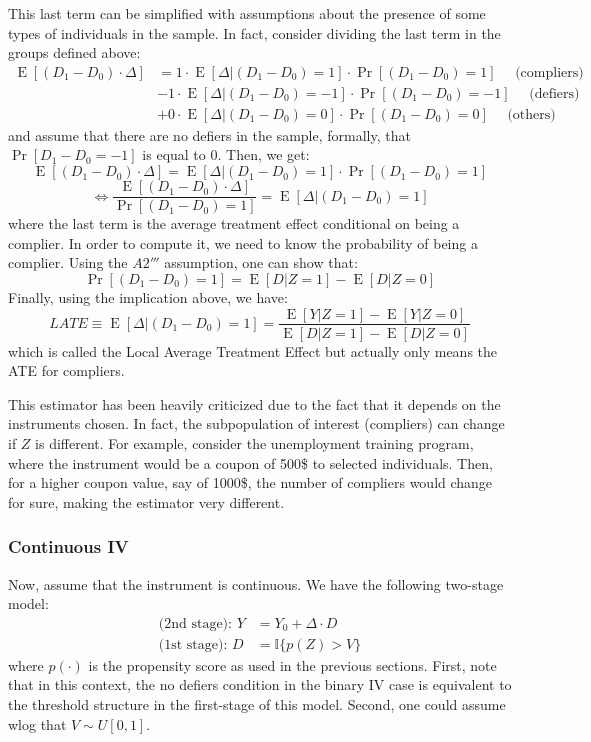 \documentclass[12pt]{report}
\newcommand{\E}[1]{\operatorname{E}\left[#1\right]}
\newcommand{\Prob}[1]{\operatorname{Pr}\left[#1\right]}
\begin{document}
This last term can be simplified with assumptions about the presence of some types of individuals in the sample. In fact, consider dividing the last term in the groups defined above: \begin{align*}
\E{(D_1 - D_0)\cdot \Delta} & = 1 \cdot \E{\Delta\vert(D_1 - D_0)=1} \cdot \Prob{(D_1 - D_0)=1} \quad \text{ (compliers)}\\
& - 1 \cdot \E{\Delta\vert(D_1 - D_0)=-1} \cdot \Prob{(D_1 - D_0)=-1} \quad \text{ (defiers)}\\
& + 0 \cdot \E{\Delta\vert(D_1 - D_0)=0} \cdot \Prob{(D_1 - D_0)=0} \quad \text{ (others)}
\end{align*}
and assume that there are no defiers in the sample, formally, that $\Prob{D_1 - D_0=-1}$ is equal to 0. Then, we get: $$\E{(D_1 - D_0)\cdot \Delta} = \E{\Delta\vert(D_1 - D_0)=1} \cdot \Prob{(D_1 - D_0)=1} $$
$$\Leftrightarrow \frac{\E{(D_1 - D_0)\cdot \Delta}}{\Prob{(D_1 - D_0)=1}} = \E{\Delta\vert(D_1 - D_0)=1} $$ where the last term is the average treatment effect conditional on being a complier. In order to compute it, we need to know the probability of being a complier. Using the $A2'''$ assumption, one can show that: $$
\Prob{(D_1 - D_0)=1} = \E{D\vert Z=1} - \E{D\vert Z=0} $$ Finally, using the implication above, we have: $$LATE\equiv \E{\Delta\vert(D_1 - D_0)=1} = \frac{\E{Y\vert Z=1} - \E{Y\vert Z=0}}{\E{D\vert Z=1} - \E{D\vert Z=0}} $$ which is called the Local Average Treatment Effect but actually only means the ATE for compliers.

This estimator has been heavily criticized due to the fact that it depends on the instruments chosen. In fact, the subpopulation of interest (compliers) can change if $Z$ is different. For example, consider the unemployment training program, where the instrument would be a coupon of 500\$ to selected individuals. Then, for a higher coupon value, say of 1000\$, the number of compliers would change for sure, making the estimator very different.

\subsubsection{Continuous IV}

Now, assume that the instrument is continuous. We have the following two-stage model:\begin{align*}
\text{(2nd stage): } Y & = Y_0 + \Delta\cdot D \\
\text{(1st stage): } D & = \mathbb{I}\{p(Z) > V\}
\end{align*} where $p(\cdot)$ is the propensity score as used in the previous sections. First, note that in this context, the no defiers condition in the binary IV case is equivalent to the threshold structure in the first-stage of this model. Second, one could assume wlog that $V\sim U[0,1]$.
\end{document}
